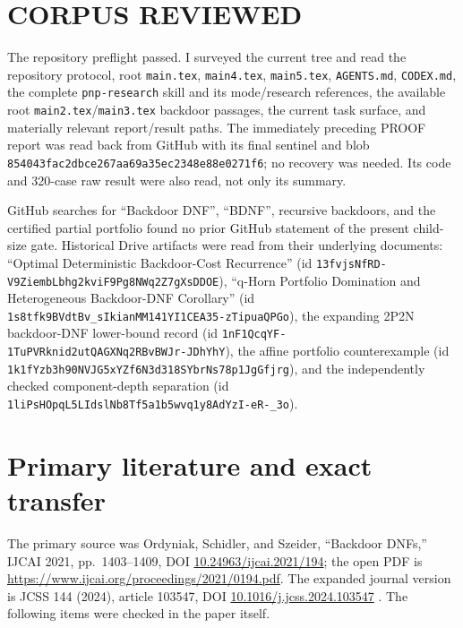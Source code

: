 \documentclass[11pt]{article}
\begin{document}
\section*{CORPUS REVIEWED}
The repository preflight passed.  I surveyed the current tree and read the
repository protocol, root \texttt{main.tex}, \texttt{main4.tex},
\texttt{main5.tex}, \texttt{AGENTS.md}, \texttt{CODEX.md}, the complete
\texttt{pnp-research} skill and its mode/research references, the available
root \texttt{main2.tex}/\texttt{main3.tex} backdoor passages, the current task
surface, and materially relevant report/result paths.  The immediately
preceding PROOF report
was read back from GitHub with its final sentinel and blob
\texttt{854043fac2dbce267aa69a35ec2348e88e0271f6}; no recovery was needed.
Its code and 320-case raw result were also read, not only its summary.

GitHub searches for ``Backdoor DNF'', ``BDNF'', recursive backdoors, and the
certified partial portfolio found no prior GitHub statement of the present
child-size gate.  Historical Drive artifacts were read from their underlying
documents: ``Optimal Deterministic Backdoor-Cost Recurrence''
(id \texttt{13fvjsNfRD-V9ZiembLbhg2kviF9Pg8NWq2Z7gXsDDOE}), ``q-Horn
Portfolio Domination and Heterogeneous Backdoor-DNF Corollary''
(id \texttt{1s8tfk9BVdtBv\_sIkianMM141YI1CEA35-zTipuaQPGo}), the expanding
2P2N backdoor-DNF lower-bound record
(id \texttt{1nF1QcqYF-1TuPVRknid2utQAGXNq2RBvBWJr-JDhYhY}), the affine
portfolio counterexample
(id \texttt{1k1fYzb3h90NVJG5xYZf6N3d318SYbrNs78p1JgGfjrg}), and the
independently checked component-depth separation
(id \texttt{1liPsHOpqL5LIdslNb8Tf5a1b5wvq1y8AdYzI-eR-\_3o}).

\section*{Primary literature and exact transfer}
The primary source was Ordyniak, Schidler, and Szeider, ``Backdoor DNFs,''
IJCAI 2021, pp.~1403--1409, DOI
\href{https://doi.org/10.24963/ijcai.2021/194}{10.24963/ijcai.2021/194}; the
open PDF is
\url{https://www.ijcai.org/proceedings/2021/0194.pdf}.
The expanded journal version is JCSS 144 (2024), article 103547, DOI
\href{https://doi.org/10.1016/j.jcss.2024.103547}{10.1016/j.jcss.2024.103547}
\cite{ordyniak2021bdnf}.
The following items were checked in the paper itself.
\end{document}

